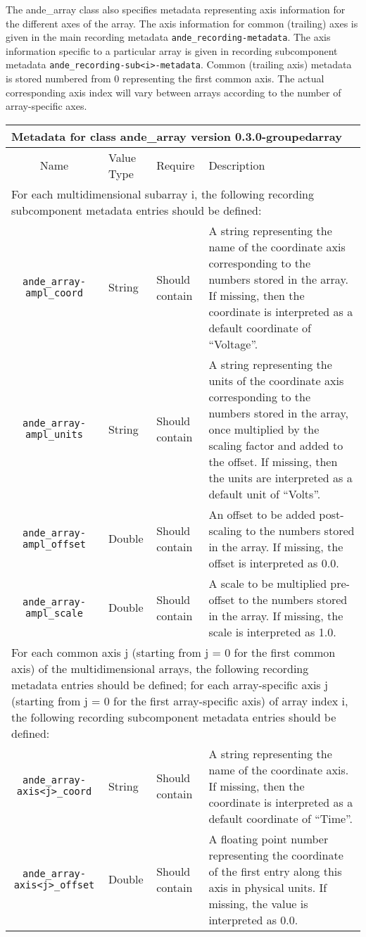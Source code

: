 \documentclass{article}
\newenvironment{AndeMetadata}[3]{
  
  \begin{tabular}{|c p{.4in} p{.5in} p{2.9in}|}
    \multicolumn{4}{l}{{\Large \bf Metadata for class #3}{\Large \ttfamily \fontseries{b} #1} version #2 }\\
    \hline
    Name & Value Type & Require & Description \\
    \hline
}{
  \hline
  \end{tabular}
}
\newcommand{\AndeMetadataLine}[4]{{\tt #1} & #2 & #3 & #4 \\}
\newcommand{\AndeMetadataColSpanLine}[1]{\hline \multicolumn{4}{|l|}{#1} \\ \hline}
\newcommand{\AndeMetadataColSpanParbox}[1]{\hline \multicolumn{4}{|l|}{\parbox[t]{6in}{#1}} \\ \hline}
\begin{document}
The ande\_array class also specifies metadata representing axis information for the different axes of the array. The axis information for common (trailing) axes is given in the main recording metadata {\tt ande\_recording-metadata}. The axis information specific to a particular array is given in recording subcomponent metadata {\tt ande\_recording-sub<i>-metadata}. Common (trailing axis) metadata is stored numbered from 0 representing the first common axis. The actual corresponding axis index will vary between arrays according to the number of array-specific axes. 

\begin{AndeMetadata}{ande\_array}{0.3.0-groupedarray}{}
  \AndeMetadataColSpanLine{For each multidimensional subarray i, the following recording subcomponent metadata entries should be defined:}
  \AndeMetadataLine{ande\_array-ampl\_coord}{String}{Should contain}{
    A string representing the name of the coordinate axis corresponding to the numbers stored in the array. If missing, then the coordinate is interpreted as a default coordinate of ``Voltage''.
  }
  \AndeMetadataLine{ande\_array-ampl\_units}{String}{Should contain}{
    A string representing the units of the coordinate axis corresponding to the numbers stored in the array, once multiplied by the scaling factor and added to the offset. If missing, then the units are interpreted as a default unit of ``Volts''. 
  }
  \AndeMetadataLine{ande\_array-ampl\_offset}{Double}{Should contain}{
    An offset to be added post-scaling to the numbers stored in the array. If missing, the offset is interpreted as 0.0.
  }
  \AndeMetadataLine{ande\_array-ampl\_scale}{Double}{Should contain}{
    A scale to be multiplied pre-offset to the numbers stored in the array. If missing, the scale is interpreted as 1.0.
  }
  \AndeMetadataColSpanParbox{For each common axis j (starting from j = 0 for the first common axis) of the multidimensional arrays, the following recording metadata entries should be defined; for each array-specific axis j (starting from j = 0 for the first array-specific axis) of array index i, the following recording subcomponent metadata entries should be defined:}
  \AndeMetadataLine{ande\_array-axis<j>\_coord}{String}{Should contain}{
    A string representing the name of the coordinate axis. If missing, then the coordinate is interpreted as a default coordinate of ``Time''.
  }
  \AndeMetadataLine{ande\_array-axis<j>\_offset}{Double}{Should contain}{
    A floating point number representing the coordinate of the first entry along this axis in physical units. If missing, the value is interpreted as 0.0.
}
\end{AndeMetadata}
\end{document}
